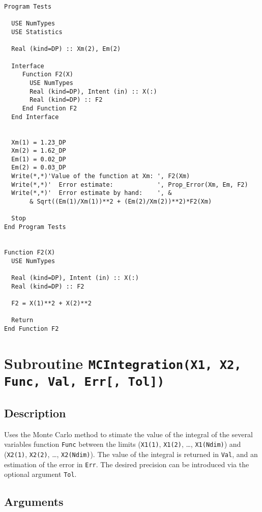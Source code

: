 \begin{lstlisting}[emph=Prop_Error,
                   emphstyle=\color{blue},
                   frame=trBL,
                   caption=Propagating errors in a function.,
                   label=properror]
Program Tests

  USE NumTypes
  USE Statistics

  Real (kind=DP) :: Xm(2), Em(2)

  Interface 
     Function F2(X)
       USE NumTypes
       Real (kind=DP), Intent (in) :: X(:)
       Real (kind=DP) :: F2
     End Function F2
  End Interface


  Xm(1) = 1.23_DP
  Xm(2) = 1.62_DP
  Em(1) = 0.02_DP
  Em(2) = 0.03_DP
  Write(*,*)'Value of the function at Xm: ', F2(Xm)
  Write(*,*)'  Error estimate:            ', Prop_Error(Xm, Em, F2)
  Write(*,*)'  Error estimate by hand:    ', &
       & Sqrt((Em(1)/Xm(1))**2 + (Em(2)/Xm(2))**2)*F2(Xm)

  Stop
End Program Tests


Function F2(X)
  USE NumTypes
  
  Real (kind=DP), Intent (in) :: X(:)
  Real (kind=DP) :: F2

  F2 = X(1)**2 + X(2)**2 
       
  Return
End Function F2
\end{lstlisting}

\section{Subroutine \texttt{MCIntegration(X1, X2, Func, Val, Err[, Tol])}}

\subsection{Description}

Uses the Monte Carlo method to stimate the value of the integral of
the several variables function \texttt{Func} between the limits
(\texttt{X1(1)}, \texttt{X1(2)}, \dots, \texttt{X1(Ndim)}) and 
(\texttt{X2(1)}, \texttt{X2(2)}, \dots, \texttt{X2(Ndim)}). The value
of the integral is returned in \texttt{Val}, and an estimation of the
error in \texttt{Err}. The desired precision can be introduced via the
optional argument \texttt{Tol}.


\subsection{Arguments}

